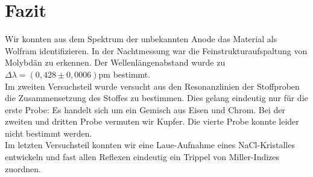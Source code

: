 \section{Fazit}
Wir konnten aus dem Spektrum der unbekannten Anode das Material als Wolfram identifizieren. In der Nachtmessung war die Feinstrukturaufspaltung von Molybdän zu erkennen. Der Wellenlängenabstand wurde zu $\Delta \lambda = (0,428 \pm 0,0006) \si{\pico\meter}$ bestimmt.\\
Im zweiten Versuchsteil wurde versucht aus den Resonanzlinien der Stoffproben die Zusammensetzung des Stoffes zu bestimmen. Dies gelang eindeutig nur für die erste Probe: Es handelt sich um ein Gemisch aus Eisen und Chrom. Bei der zweiten und dritten Probe vermuten wir Kupfer. Die vierte Probe konnte leider nicht bestimmt werden.\\
Im letzten Versuchsteil konnten wir eine Laue-Aufnahme eines NaCl-Kristalles entwickeln und fast allen Reflexen eindeutig ein Trippel von Miller-Indizes zuordnen. 
